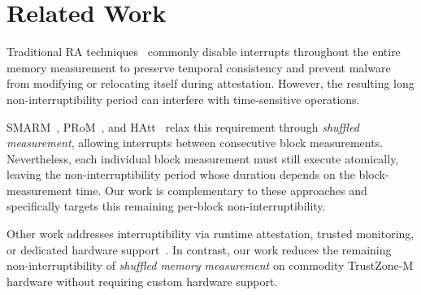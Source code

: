 \documentclass[conference]{IEEEtran}
\newcommand{\smarmcopy}{SMARM-Snap\xspace}
\newcommand{\smarmlock}{SMARM-Guard\xspace}
\begin{document}
\section{Related Work}
\label{sec:related}

Traditional RA techniques~\cite{eldefrawy2012smart,nunes2019vrased,eldefrawy2017hydra} commonly disable interrupts throughout the entire memory measurement to preserve temporal consistency and prevent malware from modifying or relocating itself during attestation. However, the resulting long non-interruptibility period can interfere with time-sensitive operations.

SMARM~\cite{carpent2018smarm}, PRoM~\cite{aman2021prom}, and HAtt~\cite{aman2018hatt} relax this requirement through \emph{shuffled measurement}, allowing interrupts between consecutive block measurements. Nevertheless, each individual block measurement must still execute atomically, leaving the non-interruptibility period whose duration depends on the block-measurement time.
Our work is complementary to these approaches and specifically targets this remaining per-block non-interruptibility.

Other work addresses interruptibility via runtime attestation, trusted monitoring, or dedicated hardware support~\cite{isc-flat,asap,ida2024,lo-fat,litehax,atrium}.
In contrast, our work reduces the remaining non-interruptibility of \emph{shuffled memory measurement} on commodity TrustZone-M hardware without requiring custom hardware support.


\end{document}
